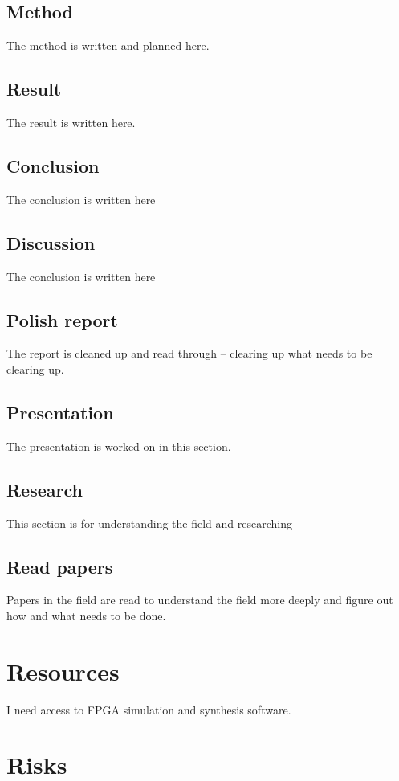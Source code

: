 \documentclass[msc,lith,english]{liuthesis}
\begin{document}
\subsection{Method}
The method is written and planned here.

\subsection{Result}
The result is written here.

\subsection{Conclusion}
The conclusion is written here

\subsection{Discussion}
The conclusion is written here

\subsection{Polish report}
The report is cleaned up and read through -- clearing up what needs to be clearing up.

\subsection{Presentation}
The presentation is worked on in this section.

\subsection{Research}
This section is for understanding the field and researching

\subsection{Read papers}
Papers in the field are read to understand the field more deeply and figure out how and what needs to be done.

\section{Resources}
I need access to FPGA simulation and synthesis software.

\section{Risks}
\end{document}
